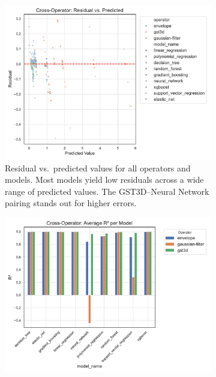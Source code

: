 \begin{figure}[htbp]
    \centering
    \begin{subfigure}[t]{0.49\textwidth}
        \centering
        \includegraphics[width=\textwidth]{assets/images/05/residual_vs_predicted}
        \caption{Residual vs.\ predicted values for all operators and models.
        Most models yield low residuals across a wide range of predicted values.
        The \ac{GST3D}–Neural Network pairing stands out for higher errors.
        }
    \end{subfigure}
    \hfill
    \begin{subfigure}[t]{0.49\textwidth}
        \centering
        \includegraphics[width=\textwidth]{assets/images/05/cross_model_r2_bar}

\end{subfigure}
\end{figure}
